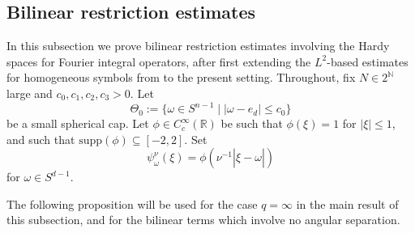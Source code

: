 \documentclass{amsart}
\numberwithin{equation}{section}
\theoremstyle{definition}
\newcommand{\R}{\mathbb{R}}
\newcommand{\N}{\mathbb{N}}
\newcommand {\supp}{\mathrm{supp}}
\newcommand {\w}{\omega}
\begin{document}
\subsection{Bilinear restriction estimates}\label{subsec:bilinear}

In this subsection we prove bilinear restriction estimates involving the Hardy spaces for Fourier integral operators, after first extending the $L^{2}$-based estimates for homogeneous symbols from \cite{SchippaTataru2025} to the present setting. Throughout, fix $N\in 2^{\N}$ large and $c_{0},c_{1},c_{2},c_{3}>0$. Let 
\begin{equation}\label{eq:thetazero}
\Theta_{0}:=\{\w\in S^{n-1}\mid |\w-e_{d}|\leq c_{0}\}
\end{equation}
be a small spherical cap. 
Let $\phi \in C^\infty_c(\R)$ be such that $\phi(\xi) =1$ for $|\xi| \leq 1$, and such that $\supp(\phi) \subseteq [-2,2]$. Set
\begin{equation}
\label{eq:AngularLocalization}
    \psi^{\nu}_{\omega}(\xi) = \phi(\nu^{-1}|\hat{\xi}-\omega|)%
\end{equation}
for $\omega \in S^{d-1}$.

The following proposition will be used for the case $q=\infty$ in the main result of this subsection, and for the bilinear terms which involve no angular separation. 
\end{document}

